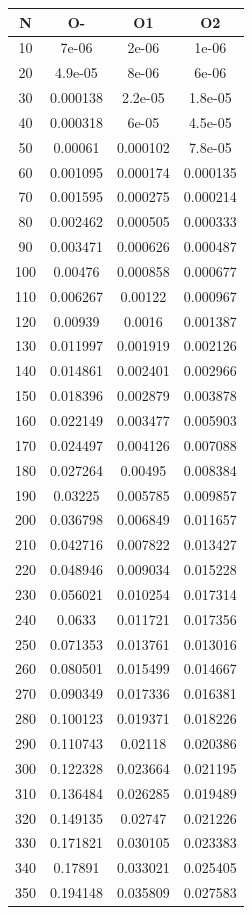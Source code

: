 \begin{center}
\begin{tabular}{| c | c | c | c |}
\hline
\textbf{N} & \textbf{O-} & \textbf{O1} & \textbf{O2} \\ \hline
10 & 7e-06 & 2e-06 & 1e-06 \\ \hline
20 & 4.9e-05 & 8e-06 & 6e-06 \\ \hline
30 & 0.000138 & 2.2e-05 & 1.8e-05 \\ \hline
40 & 0.000318 & 6e-05 & 4.5e-05 \\ \hline
50 & 0.00061 & 0.000102 & 7.8e-05 \\ \hline
60 & 0.001095 & 0.000174 & 0.000135 \\ \hline
70 & 0.001595 & 0.000275 & 0.000214 \\ \hline
80 & 0.002462 & 0.000505 & 0.000333 \\ \hline
90 & 0.003471 & 0.000626 & 0.000487 \\ \hline
100 & 0.00476 & 0.000858 & 0.000677 \\ \hline
110 & 0.006267 & 0.00122 & 0.000967 \\ \hline
120 & 0.00939 & 0.0016 & 0.001387 \\ \hline
130 & 0.011997 & 0.001919 & 0.002126 \\ \hline
140 & 0.014861 & 0.002401 & 0.002966 \\ \hline
150 & 0.018396 & 0.002879 & 0.003878 \\ \hline
160 & 0.022149 & 0.003477 & 0.005903 \\ \hline
170 & 0.024497 & 0.004126 & 0.007088 \\ \hline
180 & 0.027264 & 0.00495 & 0.008384 \\ \hline
190 & 0.03225 & 0.005785 & 0.009857 \\ \hline
200 & 0.036798 & 0.006849 & 0.011657 \\ \hline
210 & 0.042716 & 0.007822 & 0.013427 \\ \hline
220 & 0.048946 & 0.009034 & 0.015228 \\ \hline
230 & 0.056021 & 0.010254 & 0.017314 \\ \hline
240 & 0.0633 & 0.011721 & 0.017356 \\ \hline
250 & 0.071353 & 0.013761 & 0.013016 \\ \hline
260 & 0.080501 & 0.015499 & 0.014667 \\ \hline
270 & 0.090349 & 0.017336 & 0.016381 \\ \hline
280 & 0.100123 & 0.019371 & 0.018226 \\ \hline
290 & 0.110743 & 0.02118 & 0.020386 \\ \hline
300 & 0.122328 & 0.023664 & 0.021195 \\ \hline
310 & 0.136484 & 0.026285 & 0.019489 \\ \hline
320 & 0.149135 & 0.02747 & 0.021226 \\ \hline
330 & 0.171821 & 0.030105 & 0.023383 \\ \hline
340 & 0.17891 & 0.033021 & 0.025405 \\ \hline
350 & 0.194148 & 0.035809 & 0.027583 \\ \hline
\hline
\end{tabular}
\end{center}
